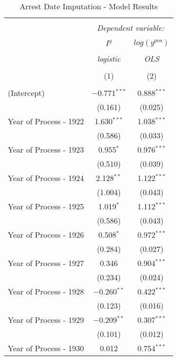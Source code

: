 
\begin{table}[!h] \centering 
  \caption{Arrest Date Imputation - Model Results} 
  \label{tab:date_imp_results} 
\small 
\begin{tabular}{@{\extracolsep{5pt}}lcc} 
\\[-1.8ex]\hline 
\hline \\[-1.8ex] 
 & \multicolumn{2}{c}{\textit{Dependent variable:}} \\ 
\cline{2-3} 
\\[-1.8ex] & $I^y$ & $log(y^{\text{pos}})$ \\ 
\\[-1.8ex] & \textit{logistic} & \textit{OLS} \\ 
\\[-1.8ex] & (1) & (2)\\ 
\hline \\[-1.8ex] 
 (Intercept) & $-$0.771$^{***}$ & 0.888$^{***}$ \\ 
  & (0.161) & (0.025) \\ 
  Year of Process - 1922 & 1.630$^{***}$ & 1.038$^{***}$ \\ 
  & (0.586) & (0.033) \\ 
  Year of Process - 1923 & 0.955$^{*}$ & 0.976$^{***}$ \\ 
  & (0.510) & (0.039) \\ 
  Year of Process - 1924 & 2.128$^{**}$ & 1.122$^{***}$ \\ 
  & (1.004) & (0.043) \\ 
  Year of Process - 1925 & 1.019$^{*}$ & 1.112$^{***}$ \\ 
  & (0.586) & (0.043) \\ 
  Year of Process - 1926 & 0.508$^{*}$ & 0.972$^{***}$ \\ 
  & (0.284) & (0.027) \\ 
  Year of Process - 1927 & 0.346 & 0.904$^{***}$ \\ 
  & (0.234) & (0.024) \\ 
  Year of Process - 1928 & $-$0.260$^{**}$ & 0.422$^{***}$ \\ 
  & (0.123) & (0.016) \\ 
  Year of Process - 1929 & $-$0.209$^{**}$ & 0.307$^{***}$ \\ 
  & (0.101) & (0.012) \\ 
  Year of Process - 1930 & 0.012 & 0.754$^{***}$ \\ 

\end{tabular}
\end{table}
